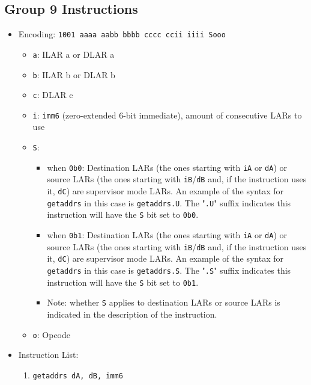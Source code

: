 \documentclass{article}
\begin{document}
	\subsection{Group 9 Instructions}
		\begin{itemize}
		\item Encoding: \texttt{1001 aaaa aabb bbbb  cccc ccii iiii Sooo}
			\begin{itemize}
			\item \texttt{a}: ILAR a or DLAR a
			\item \texttt{b}: ILAR b or DLAR b
			\item \texttt{c}: DLAR c
			\item \texttt{i}: \texttt{imm6} (zero-extended 6-bit
				immediate), amount of consecutive LARs to use
			\item \texttt{S}:
				\begin{itemize}
				\item when \texttt{0b0}: 
					Destination LARs (the ones starting with \texttt{iA} or
					\texttt{dA}) or source LARs (the ones starting with
					\texttt{iB}/\texttt{dB} and, if the instruction uses
					it, \texttt{dC}) are supervisor mode LARs.
					An example of the syntax for \texttt{getaddrs} in this
					case is \texttt{getaddrs.U}. The "\texttt{.U}" suffix
					indicates this instruction will have the \texttt{S} bit
					set to \texttt{0b0}.
				\item when \texttt{0b1}:
					Destination LARs (the ones starting with \texttt{iA} or
					\texttt{dA}) or source LARs (the ones starting with
					\texttt{iB}/\texttt{dB} and, if the instruction uses
					it, \texttt{dC}) are supervisor mode LARs.
					An example of the syntax for \texttt{getaddrs} in this
					case is \texttt{getaddrs.S}. The "\texttt{.S}" suffix
					indicates this instruction will have the \texttt{S} bit
					set to \texttt{0b1}.
				\item Note: whether \texttt{S} applies to destination LARs
					or source LARs is indicated in the description of the
					instruction.
				\end{itemize}
			\item \texttt{o}: Opcode
			\end{itemize}
		\item Instruction List:
			\begin{enumerate}
			\item \texttt{getaddrs dA, dB, imm6}
				\begin{itemize}

\end{itemize}
\end{enumerate}
\end{itemize}
\end{document}
